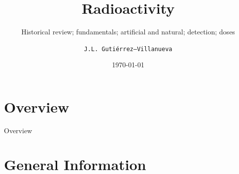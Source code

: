 \documentclass[newPxFont,numfooter,sectionpages]{beamer}
\title{Radioactivity}
\subtitle{Historical review; fundamentals; artificial and natural; detection; doses}
\date{\today}
\author{\texttt{J.L. Guti\'errez--Villanueva}}
\institute{LaRUC--Radon group \par U. Cantabria (Spain)}
\newcommand{\1}{\'{\i}}
\begin{document}
%
%

\maketitle



%
%

\section*{Overview}
\begin{frame}{Overview}
\tableofcontents[hideallsubsections]
\end{frame}

\section{General Information}

\end{document}

